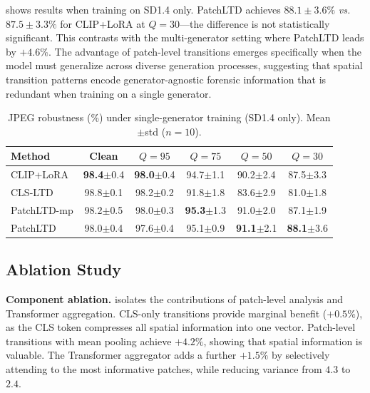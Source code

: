 \documentclass[runningheads]{llncs}
\newcommand{\ours}{PatchLTD}
\newcommand{\vs}{\textit{vs.}}
\begin{document}
 shows results when training on SD1.4 only.
\ours{} achieves $88.1{\pm}3.6\%$ \vs{} $87.5{\pm}3.3\%$ for CLIP+LoRA at $Q{=}30$---the difference is not statistically significant.
This contrasts with the multi-generator setting where \ours{} leads by $+4.6\%$.
The advantage of patch-level transitions emerges specifically when the model must generalize across diverse generation processes, suggesting that spatial transition patterns encode generator-agnostic forensic information that is redundant when training on a single generator.

\begin{table}[t]
\centering
\caption{JPEG robustness (\%) under single-generator training (SD1.4 only). Mean$\pm$std ($n{=}10$).}
\label{tab:jpeg_single}
\setlength{\tabcolsep}{4pt}
\begin{tabular}{lccccc}
\toprule
Method & Clean & $Q{=}95$ & $Q{=}75$ & $Q{=}50$ & $Q{=}30$ \\
\midrule
CLIP+LoRA      & \textbf{98.4}\scriptsize$\pm$0.4 & \textbf{98.0}\scriptsize$\pm$0.4 & 94.7\scriptsize$\pm$1.1 & 90.2\scriptsize$\pm$2.4 & 87.5\scriptsize$\pm$3.3 \\
CLS-LTD        & 98.8\scriptsize$\pm$0.1 & 98.2\scriptsize$\pm$0.2 & 91.8\scriptsize$\pm$1.8 & 83.6\scriptsize$\pm$2.9 & 81.0\scriptsize$\pm$1.8 \\
\ours{}-mp     & 98.2\scriptsize$\pm$0.5 & 98.0\scriptsize$\pm$0.3 & \textbf{95.3}\scriptsize$\pm$1.3 & 91.0\scriptsize$\pm$2.0 & 87.1\scriptsize$\pm$1.9 \\
\ours{}        & 98.0\scriptsize$\pm$0.4 & 97.6\scriptsize$\pm$0.4 & 95.1\scriptsize$\pm$0.9 & \textbf{91.1}\scriptsize$\pm$2.1 & \textbf{88.1}\scriptsize$\pm$3.6 \\
\bottomrule
\end{tabular}
\end{table}


\subsection{Ablation Study}
\label{sec:ablation}

\noindent\textbf{Component ablation.}
 isolates the contributions of patch-level analysis and Transformer aggregation.
CLS-only transitions provide marginal benefit ($+0.5\%$), as the CLS token compresses all spatial information into one vector.
Patch-level transitions with mean pooling achieve $+4.2\%$, showing that spatial information is valuable.
The Transformer aggregator adds a further $+1.5\%$ by selectively attending to the most informative patches, while reducing variance from $4.3$ to $2.4$.
\end{document}
